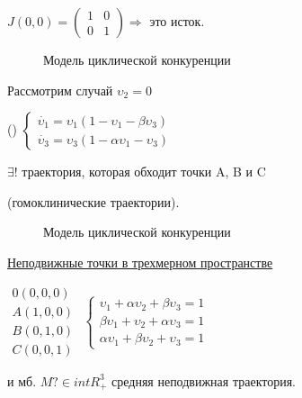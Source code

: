 \documentclass[oneside, final, 12pt]{article}
\begin{document}
\vspace{0.5cm}
\(
 J(0,0) = 
 \begin{pmatrix}
 1 & 0\\
 0 & 1
 \end{pmatrix}
\)\hspace{0.5cm}\(\Rightarrow\) это исток.
\begin{figure} [h!]
			\caption{Модель циклической конкуренции}	
\end{figure}

\newpage
Рассмотрим случай { \underline{\(\upsilon_2 = 0\)}}

\vspace{0.5cm}
({})
\(
 \begin{cases}
 	\dot{\upsilon_1} = \upsilon_1(1-\upsilon_1 - \beta\upsilon_3)
 	\\
 	\dot{\upsilon_3} = \upsilon_3(1-\alpha\upsilon_1 - \upsilon_3)
 \end{cases}
\)

\vspace{0.5cm}
\(\exists!\) траектория, которая обходит точки  A, B и C

(гомоклинические траектории).
\begin{figure} [h!]
			\caption{Модель циклической конкуренции}	
\end{figure}

\vspace{0.5cm}
{\underline{Неподвижные точки в трехмерном пространстве}}

\vspace{0.5cm}
\(
 \begin{matrix}
 0(0,0,0)\\
 A(1,0,0)\\
 B(0,1,0)\\
 C(0,0,1)
 \end{matrix}
\)\hspace{2cm}
\(
 \begin{cases}
 	\upsilon_1 + \alpha\upsilon_2 + \beta\upsilon_3 = 1
 	\\
 	\beta\upsilon_1 + \upsilon_2 + \alpha\upsilon_3 = 1
 	\\
 	\alpha\upsilon_1 + \beta\upsilon_2 + \upsilon_3 = 1
 \end{cases}
\)

\vspace{0.5cm}
и мб. \(M ? \in intR_+^3\) средняя неподвижная траектория.
\end{document}
